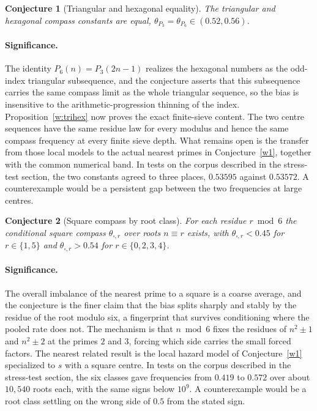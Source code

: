 \documentclass[11pt]{article}
\newtheorem{conjecture}{Conjecture}
\theoremstyle{definition}
\begin{document}
\begin{conjecture}[Triangular and hexagonal equality]\label{w4}
The triangular and hexagonal compass constants are equal, $\theta_{P_3}=\theta_{P_6}\in(0.52,0.56)$.
\end{conjecture}

\paragraph{Significance.}
The identity $P_6(n)=P_3(2n-1)$ realizes the hexagonal numbers as the odd-index triangular subsequence, and the conjecture asserts that this subsequence carries the same compass limit as the whole triangular sequence, so the bias is insensitive to the arithmetic-progression thinning of the index.  Proposition~\ref{w:trihex} now proves the exact finite-sieve content.  The two centre sequences have the same residue law for every modulus and hence the same compass frequency at every finite sieve depth.  What remains open is the transfer from those local models to the actual nearest primes in Conjecture~\ref{w1}, together with the common numerical band.  In tests on the corpus described in the stress-test section, the two constants agreed to three places, $0.53595$ against $0.53572$.  A counterexample would be a persistent gap between the two frequencies at large centres.

\begin{conjecture}[Square compass by root class]\label{w5}
For each residue $r\bmod6$ the conditional square compass $\theta_{\square,r}$ over roots $n\equiv r$ exists, with $\theta_{\square,r}<0.45$ for $r\in\{1,5\}$ and $\theta_{\square,r}>0.54$ for $r\in\{0,2,3,4\}$.
\end{conjecture}

\paragraph{Significance.}
The overall imbalance of the nearest prime to a square is a coarse average, and the conjecture is the finer claim that the bias splits sharply and stably by the residue of the root modulo six, a fingerprint that survives conditioning where the pooled rate does not.  The mechanism is that $n\bmod6$ fixes the residues of $n^2\pm1$ and $n^2\pm2$ at the primes $2$ and $3$, forcing which side carries the small forced factors.  The nearest related result is the local hazard model of Conjecture~\ref{w1} specialized to $s$ with a square centre.  In tests on the corpus described in the stress-test section, the six classes gave frequencies from $0.419$ to $0.572$ over about $10{,}540$ roots each, with the same signs below $10^9$.  A counterexample would be a root class settling on the wrong side of $0.5$ from the stated sign.
\end{document}
